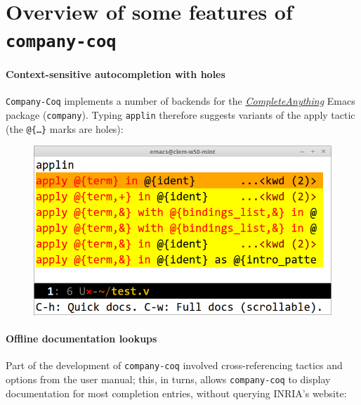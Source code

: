 \documentclass[preprint]{sigplanconf}
\begin{document}
\section*{Overview of some features of \texttt{company-coq}}

\paragraph{Context-sensitive autocompletion with holes} \texttt{Company-Coq} implements a number of backends for the \href{https://company-mode.github.io/}{\emph{CompleteAnything}} Emacs package (\texttt{company}). Typing \texttt{appl{\kern0.5pt}in} therefore suggests variants of the apply tactic (the \texttt{@\{\ldots\}} marks are holes):

\begin{figure}[H]
  \centering
  \includegraphics[width=\linewidth]{apply-in-xxl.png}
\end{figure}

\paragraph{Offline documentation lookups} Part of the development of \texttt{company-coq} involved cross-referencing tactics and options from the user manual; this, in turns, allows \texttt{company-coq} to display documentation for most completion entries, without querying INRIA's website:
\end{document}
